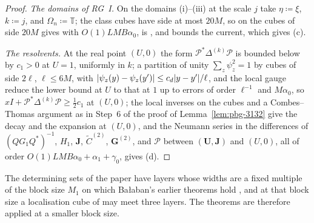\documentclass[11pt]{preprint}
\DeclarePairedDelimiter{\abs}{\lvert}{\rvert}
\numberwithin{equation}{section}
\theoremstyle{definition}
\theoremstyle{remark}
\theoremstyle{plain}
\begin{document}
\begin{proof}
\emph{The domains of RG~I.} On the domains (i)--(iii) at the scale $j$ take $\eta \coloneqq \xi$, $k \coloneqq j$, and $\Omega_n \coloneqq \mathbb T$; the class cubes have side at most $20M$, so \cite[(1.12)]{BalabanRG1} on the cubes of side $20M$ gives \cite[(3.35)]{BalabanPBG} with $O(1)LMB\alpha_0$, \cite[(1.13)]{BalabanRG1} is \cite[(3.37)]{BalabanPBG}, and \cite[(1.14)]{BalabanRG1} bounds the current, which gives (c).

\emph{The resolvents.} At the real point $(U, 0)$ the form $\mathcal P^*\Delta^{(k)}\mathcal P$ is bounded below by $c_1 > 0$ at $U = 1$, uniformly in $k$; a partition of unity $\sum_z\psi_z^2 = 1$ by cubes of side $2\ell$, $\ell \leq 6M$, with $\abs{\psi_z(y) - \psi_z(y')} \leq c_d\abs{y - y'}/\ell$, and the local gauge reduce the lower bound at $U$ to that at $1$ up to errors of order $\ell^{-1}$ and $M\alpha_0$, so $xI + \mathcal P^*\Delta^{(k)}\mathcal P \geq \frac12c_1$ at $(U, 0)$; the local inverses on the cubes and a Combes--Thomas argument as in Step~6 of the proof of Lemma~\ref{lem:pbg-3132} give the decay and the expansion at $(U, 0)$, and the Neumann series in the differences of $(QG_1Q^*)^{-1}$, $H_1$, $\mathbf J$, $\tilde C^{(2)}$, $\mathbf G^{(2)}$, and $\mathcal P$ between $(\mathbf U, \mathbf J)$ and $(U, 0)$, all of order $O(1)LMB\alpha_0 + \alpha_1 + \gamma_0$, gives (d).
\end{proof}

The determining sets of the paper have layers whose widths are a fixed multiple of the block size $M_1$ on which Ba{\l}aban's earlier theorems hold \cite[p.~245, ll.~36--37]{BalabanCRE}, and at that block size a localisation cube of \cite{BalabanPBG} may meet three layers. The theorems are therefore applied at a smaller block size.
\end{document}
